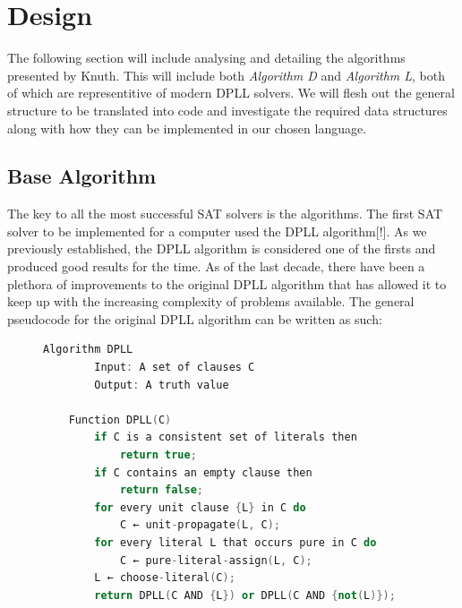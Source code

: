 \documentclass{article}
\begin{document}
\section{Design}
The following section will include analysing and detailing the algorithms presented by Knuth. This will include both
\textit{Algorithm D} and \textit{Algorithm L}, both of which are representitive of modern DPLL solvers. We will flesh out the
general structure to be translated into code and investigate the required data structures along with how they can be implemented
in our chosen language.

\subsection{Base Algorithm}
The key to all the most successful SAT solvers is the algorithms. The first SAT solver to be implemented for a computer used the
DPLL algorithm[!]. As we previously established, the DPLL algorithm is considered one of the firsts and produced good results for
the time. As of the last decade, there have been a plethora of improvements to the original DPLL algorithm that has allowed it to
keep up with the increasing complexity of problems available. The general pseudocode for the original DPLL algorithm can be
written as such:

\begin{figure}[h]
    \centering
    \begin{lstlisting}[language=C++]
    Algorithm DPLL
        Input: A set of clauses C
        Output: A truth value

    Function DPLL(C)
        if C is a consistent set of literals then
            return true;
        if C contains an empty clause then
            return false;
        for every unit clause {L} in C do
            C ← unit-propagate(L, C);
        for every literal L that occurs pure in C do
            C ← pure-literal-assign(L, C);
        L ← choose-literal(C);
        return DPLL(C AND {L}) or DPLL(C AND {not(L)});
\end{lstlisting}
\end{figure}
\end{document}
